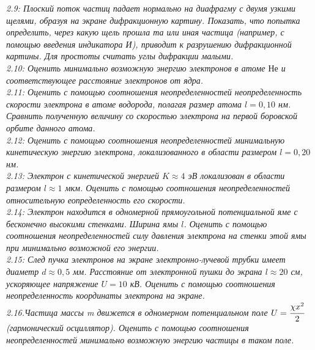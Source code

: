     \emph{2.9: Плоский поток частиц падает нормально на диафрагму 
       	с двумя узкими щелями, образуя на экране дифракционную 
       	картину. Показать, что попытка определить, через какую 
       	щель прошла та или иная частица (например, с помощью 
       	введения индикатора И), приводит к разрушению дифракционной 
       	картины. Для простоты считать углы дифракции малыми.}\\

    \emph{2.10: Оценить минимально возможную энергию электронов 
       	в атоме \( Не \) и соответствующее расстояние электронов 
       	от ядра.}\\

    \emph{2.11: Оценить с помощью соотношения неопределенностей 
       	неопределенность скорости электрона в атоме водорода, 
       	полагая размер атома \( l = 0,10 \) нм. Сравнить полученную 
       	величину со скоростью электрона на первой боровской 
       	орбите данного атома.}\\

    \emph{2.12: Оценить с помощью соотношения неопределенностей 
       	минимальную кинетическую энергию электрона, локализованного 
       	в области размером \( l = 0,20 \) нм.}\\

    \emph{2.13: Электрон с кинетической энергией \( K \approx 4 \) эВ 
       	локализован в области размером \( l \approx 1 \) мкм. 
        Оценить с помощью соотношения неопределенностей 
        относительную еопределенность его скорости.}\\

    \emph{2.14: Электрон находится в одномерной прямоугольной 
      	потенциальной яме с бесконечно высокими стенками. 
       	Ширина ямы \( l \). Оценить с помощью соотношения 
       	неопределенностей силу давления электрона на стенки этой
		ямы при минимально возможной его энергии.}\\

	\emph{2.15: След пучка электронов на экране электронно-лучевой 
		трубки имеет диаметр \( d \approx 0,5 \) мм. Расстояние от 
		электронной пушки до экрана \( l \approx 20 \) см, 
		ускоряющее напряжение \( U = 10 \) кВ. Оценить с помощью 
		соотношения неопределенность координаты электрона на экране.}\\

	\emph{2.16.Частица массы m движется в одномерном потенциальном 
		поле \( U = \cfrac{\chi x^2}{2} \) (гармонический осциллятор). 
		Оценить с помощью соотношения неопределенностей минимально 
		возможную энергию частицы в таком поле.}\\

